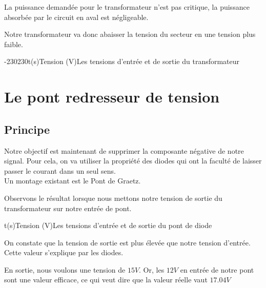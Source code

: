   La puissance demandée pour le transformateur n'est pas critique, la puissance absorbée par le circuit en aval est négligeable.

  Notre transformateur va donc abaisser la tension du secteur en une tension plus faible.

  \begin{graphicFigure}{0.6}{0.6}{0}{0.08}{-230}{230}{t(s)}{Tension (V)}{Les tensions d'entrée et de sortie du transformateur}
    \end{graphicFigure}

    \newpage 
  \section{Le pont redresseur de tension}

  \subsection{Principe}
  Notre objectif est maintenant de supprimer la composante négative de notre signal. Pour cela, on va utiliser la propriété des 
  diodes qui ont la faculté de laisser passer le courant dans un seul sens.\\
  Un montage existant est le Pont de Graetz. 


  Observons le résultat lorsque nous mettons notre tension de sortie du transformateur sur notre entrée de pont.

  \begin{graphicFigure}{0.6}{0.6}{0}{0.08}{-20}{20}{t(s)}{Tension (V)}{Les tensions d'entrée et de sortie du pont de diode}
    \end{graphicFigure}

  On constate que la tension de sortie est plus élevée que notre tension d'entrée.\\
  Cette valeur s'explique par les diodes. 
  
  En sortie, nous voulons une tension de \(15V\). Or, les $12V$ en entrée de notre pont sont une valeur efficace, ce qui veut dire 
  que la valeur réelle vaut $17.04V$

